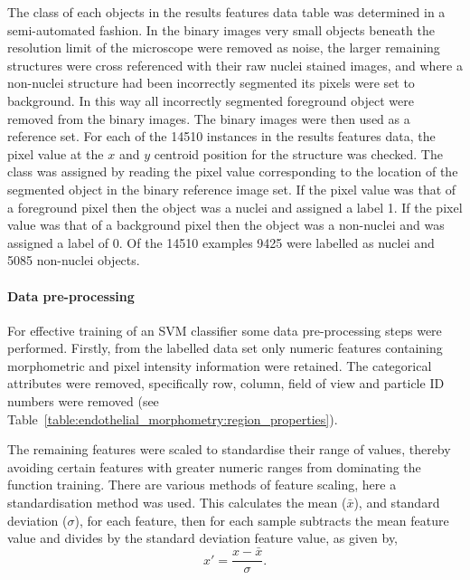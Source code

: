 The class of each objects in the results features data table was determined in a semi-automated fashion. In the binary images very small objects beneath the resolution limit of the microscope were removed as noise, the larger remaining structures were cross referenced with their raw nuclei stained images, and where a non-nuclei structure had been incorrectly segmented its pixels were set to background. In this way all incorrectly segmented foreground object were removed from the binary images. The binary images were then used as a reference set. For each of the 14510 instances in the results features data, the pixel value at the $x$ and $y$ centroid position for the structure was checked. The class was assigned by reading the pixel value corresponding to the location of the segmented object in the binary reference image set. If the pixel value was that of a foreground pixel then the object was a nuclei and assigned a label 1. If the pixel value was that of a background pixel then the object was a non-nuclei and was assigned a label of 0. Of the 14510 examples 9425 were labelled as nuclei and 5085 non-nuclei objects.

\paragraph{Data pre-processing}
For effective training of an SVM classifier some data pre-processing steps were performed. Firstly, from the labelled data set only numeric features containing morphometric and pixel intensity information were retained. The categorical attributes were removed, specifically row, column, field of view and particle ID numbers were removed (see Table~\ref{table:endothelial_morphometry:region_properties}).

The remaining features were scaled to standardise their range of values, thereby avoiding certain features with greater numeric ranges from dominating the function training. There are various methods of feature scaling, here a standardisation method was used. This calculates the mean ($\bar{x}$), and standard deviation ($\sigma$), for each feature, then for each sample subtracts the mean feature value and divides by the standard deviation feature value, as given by,
\begin{equation}
x'=\frac{x-\bar{x}}{\sigma}.
\end{equation}

